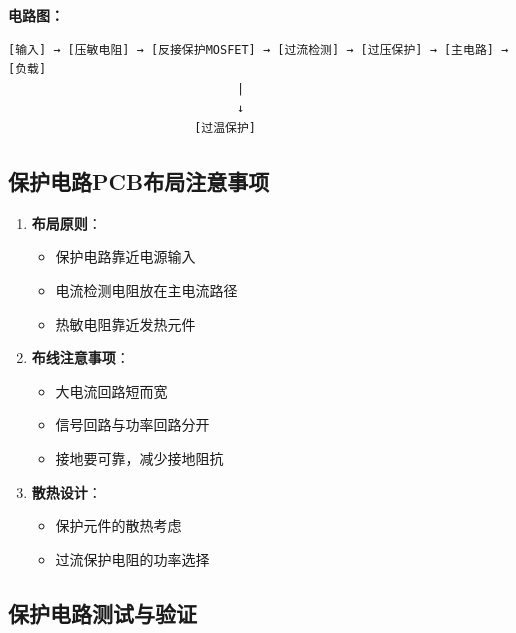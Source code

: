 \documentclass[12pt,UTF8]{ctexbook}
\begin{document}
\textbf{电路图：}

\begin{verbatim}
[输入] → [压敏电阻] → [反接保护MOSFET] → [过流检测] → [过压保护] → [主电路] → [负载]
                                |
                                ↓
                          [过温保护]
\end{verbatim}

\subsection{保护电路PCB布局注意事项}

\begin{enumerate}
    \item \textbf{布局原则}：
    \begin{itemize}
        \item 保护电路靠近电源输入
        \item 电流检测电阻放在主电流路径
        \item 热敏电阻靠近发热元件
    \end{itemize}
    
    \item \textbf{布线注意事项}：
    \begin{itemize}
        \item 大电流回路短而宽
        \item 信号回路与功率回路分开
        \item 接地要可靠，减少接地阻抗
    \end{itemize}
    
    \item \textbf{散热设计}：
    \begin{itemize}
        \item 保护元件的散热考虑
        \item 过流保护电阻的功率选择
    \end{itemize}
\end{enumerate}

\subsection{保护电路测试与验证}
\end{document}
